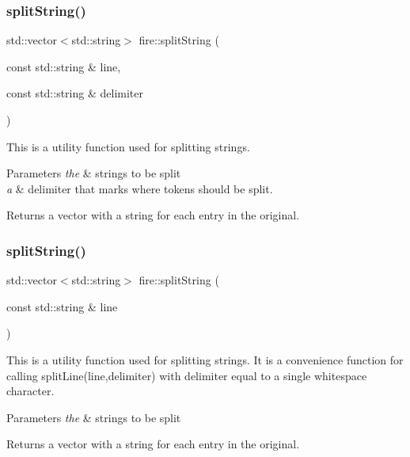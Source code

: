 \subsubsection{\texorpdfstring{split\+String()}{splitString()}\hspace{0.1cm}{\footnotesize\ttfamily [1/2]}}
{\footnotesize\ttfamily std\+::vector$<$std\+::string$>$ fire\+::split\+String (\begin{DoxyParamCaption}\item[{const std\+::string \&}]{line,  }\item[{const std\+::string \&}]{delimiter }\end{DoxyParamCaption})\hspace{0.3cm}{\ttfamily [inline]}}

This is a utility function used for splitting strings. 
\begin{DoxyParams}{Parameters}
{\em the} & strings to be split \\
\hline
{\em a} & delimiter that marks where tokens should be split. \\
\hline
\end{DoxyParams}
\begin{DoxyReturn}{Returns}
a vector with a string for each entry in the original. 
\end{DoxyReturn}
\mbox{\label{a00171_afe6f0aa2af9238d6a4e0c47c6ad4caa5}} 
\subsubsection{\texorpdfstring{split\+String()}{splitString()}\hspace{0.1cm}{\footnotesize\ttfamily [2/2]}}
{\footnotesize\ttfamily std\+::vector$<$std\+::string$>$ fire\+::split\+String (\begin{DoxyParamCaption}\item[{const std\+::string \&}]{line }\end{DoxyParamCaption})\hspace{0.3cm}{\ttfamily [inline]}}

This is a utility function used for splitting strings. It is a convenience function for calling split\+Line(line,delimiter) with delimiter equal to a single whitespace character. 
\begin{DoxyParams}{Parameters}
{\em the} & strings to be split \\
\hline
\end{DoxyParams}
\begin{DoxyReturn}{Returns}
a vector with a string for each entry in the original. 
\end{DoxyReturn}
